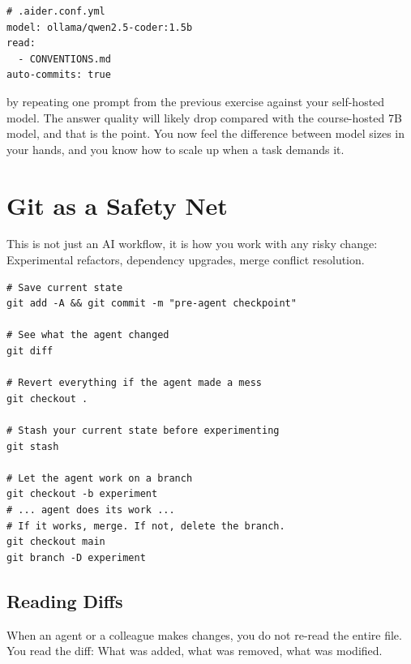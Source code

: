 \begin{verbatim}
# .aider.conf.yml
model: ollama/qwen2.5-coder:1.5b
read:
  - CONVENTIONS.md
auto-commits: true
\end{verbatim}

 by repeating one prompt from the previous exercise against your self-hosted
model. The answer quality will likely drop compared with the course-hosted 7B model, and that is
the point. You now feel the difference between model sizes in your hands, and you know how to
scale up when a task demands it.

\newpage
\section{Git as a Safety Net}

 This is not just an AI workflow, it is
how you work with any risky change: Experimental refactors, dependency upgrades, merge conflict
resolution.

\begin{verbatim}
# Save current state
git add -A && git commit -m "pre-agent checkpoint"

# See what the agent changed
git diff

# Revert everything if the agent made a mess
git checkout .

# Stash your current state before experimenting
git stash

# Let the agent work on a branch
git checkout -b experiment
# ... agent does its work ...
# If it works, merge. If not, delete the branch.
git checkout main
git branch -D experiment
\end{verbatim}


\subsection{Reading Diffs}

 When an agent or a colleague makes changes, you do not re-read
the entire file. You read the diff: What was added, what was removed, what was modified.

